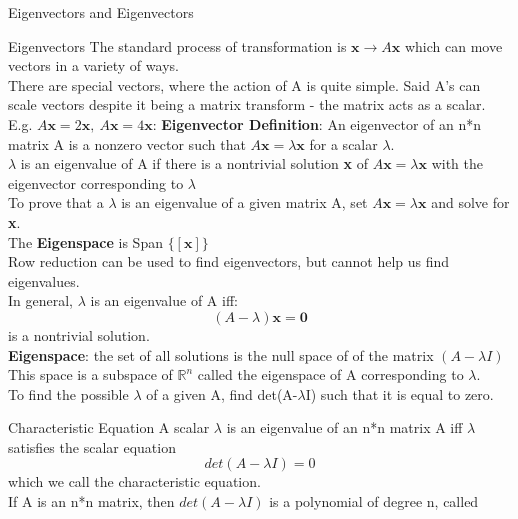 \documentclass[a4paper, 12pt]{article}
\begin{document}
\begin{section}{Eigenvectors and Eigenvectors}
\begin{subsection}
\begin{enumerate}
\end{enumerate}
\end{subsection}
\begin{subsection}{Eigenvectors}
The standard process of transformation is $\textbf{x} \to A\textbf{x}$ which can 
move vectors in a variety of ways.\\ 
There are special vectors, where the action of A is quite simple. Said A's can scale
vectors despite it being a matrix transform - the matrix acts as a scalar. \\
E.g. $A\textbf{x}=2\textbf{x},~A\textbf{x}=4\textbf{x}$:
\textbf{Eigenvector Definition}: An eigenvector of an n*n matrix A is a nonzero
vector such that $A\textbf{x}=\lambda \textbf{x}$ for a scalar $\lambda$.\\
$\lambda$ is an eigenvalue of A if there is a nontrivial solution \textbf{x} of 
$A\textbf{x}=\lambda \textbf{x}$ with the eigenvector corresponding to $\lambda$\\
To prove that a $\lambda$ is an eigenvalue of a given matrix A, set $A\textbf{x}=
\lambda\textbf{x}$ and solve for \textbf{x}.\\
The \textbf{Eigenspace} is Span $\{[\textbf{x}]\}$\\
Row reduction can be used to find eigenvectors, but cannot help us find eigenvalues.
\\ In general, $\lambda$ is an eigenvalue of A iff:
\begin{equation} \label{Eigenvalues}
	(A-\lambda )\textbf{x}=\textbf{0}
\end{equation}
is a nontrivial solution. \\
\textbf{Eigenspace}: the set of all solutions is the null space of of the matrix 
$(A-\lambda I)$\\
This space is a subspace of $\mathbb{R}^{n}$ called the eigenspace of A corresponding
to $\lambda$. \\
To find the possible $\lambda$ of a given A, find det(A-$\lambda$I) such that it is
equal to zero.\\
\end{subsection}
\begin{subsection}{Characteristic Equation}
A scalar $\lambda$ is an eigenvalue of an n*n matrix A iff $\lambda$ satisfies the
scalar equation 
\begin{equation}
det(A-\lambda I)=0
\end{equation}
which we call the characteristic equation.\\
If A is an n*n matrix, then $det(A-\lambda I)$ is a polynomial of degree n, called

\end{subsection}
\end{section}
\end{document}
